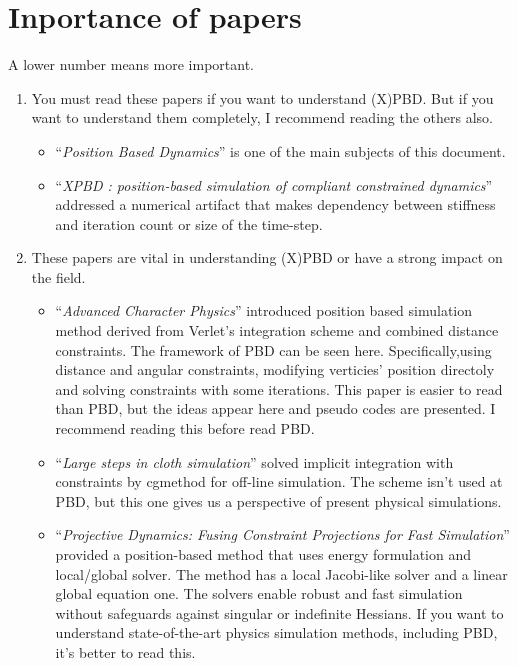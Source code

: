 \documentclass[pdflatex,sn-mathphys-num]{sn-jnl}%
\theoremstyle{thmstyleone}%
\theoremstyle{thmstyletwo}%
\theoremstyle{thmstylethree}%
\newcommand{\pname}[1]{``{\sl #1}''}
\begin{document}
\section{Inportance of papers}
A lower number means more important.
\begin{enumerate}
	\item You must read these papers if you want to understand (X)PBD. But if you want to understand them completely, I recommend reading the others also.
		\begin{itemize}
			\item \pname{Position Based Dynamics}\cite{PBD} is one of the main subjects of this document.
			\item \pname{XPBD : position-based simulation of compliant constrained dynamics}\cite{XPBD} addressed a numerical artifact that makes dependency between stiffness and \gls{iteration} count or size of the time-step.
		\end{itemize}
		\item  These papers are vital in understanding (X)PBD or have a strong impact on the field.
		\begin{itemize}
			\item\pname{Advanced Character Physics}\cite{Jakobsen2003AdvancedCP} introduced position based simulation method derived from Verlet's integration scheme and combined distance constraints. The framework of PBD can be seen here. Specifically,using distance and angular constraints, modifying verticies' position directoly and solving \gls{constraint}s with some iterations. This paper is easier to read than PBD, but the ideas appear here and pseudo codes are presented. I recommend reading this before read PBD.
			\item \pname{Large steps in cloth simulation}\cite{LargeStepBaraff} solved implicit integration with \gls{constraint}s by \gls{cgmethod} for off-line simulation. The scheme isn't used at PBD, but this one gives us a perspective of present physical simulations.
			\item \pname{Projective Dynamics: Fusing Constraint Projections for Fast Simulation}\cite{ProjDyn} provided a position-based method that uses energy formulation and local/global solver. The method has a local Jacobi-like solver and a linear global equation one. The solvers enable robust and fast simulation without safeguards against singular or indefinite Hessians.
			If you want to understand state-of-the-art physics simulation methods, including PBD, it's better to read this.
		\end{itemize}

\end{enumerate}
\end{document}
